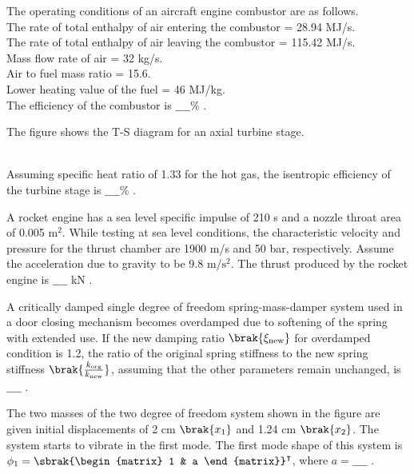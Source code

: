\item The operating conditions of an aircraft engine combustor are as follows. \\
The rate of total enthalpy of air entering the combustor = 28.94 MJ/s. \\
The rate of total enthalpy of air leaving the combustor = 115.42 MJ/s. \\
Mass flow rate of air = 32 kg/s. \\
Air to fuel mass ratio = 15.6. \\
Lower heating value of the fuel = 46 MJ/kg. \\
The efficiency of the combustor is $\_\_\_\_$\% . \\
\item The figure shows the T-S diagram for an axial turbine stage.
\begin{figure}[!ht]
\centering
\resizebox{0.5\textwidth}{!}{%

}%
\end{figure}\\
Assuming specific heat ratio of 1.33 for the hot gas, the isentropic efficiency of the turbine stage is $\_\_\_\_$\% . \\
\item A rocket engine has a sea level specific impulse of 210 s and a nozzle throat area of 0.005 $\text{m}^2$. While testing at sea level conditions, the characteristic velocity and pressure for the thrust chamber are 1900 m/s and 50 bar, respectively. Assume the acceleration due to gravity to be 9.8 m/$\text{s}^2$. The thrust produced by the rocket engine is $\_\_\_\_$ kN . \\
\item A critically damped single degree of freedom spring-mass-damper system used in a door closing mechanism becomes overdamped due to softening of the spring with extended use. If the new damping ratio $\brak{\xi_{\text{new}}}$ for overdamped condition is 1.2, the ratio of the original spring stiffness to the new spring stiffness $\brak{\frac{k_{\text{org}}}{k_{\text{new}}}}$, assuming that the other parameters remain unchanged, is $\_\_\_\_$ . \\
\item The two masses of the two degree of freedom system shown in the figure are given initial displacements of 2 cm $\brak{x_1}$ and 1.24 cm $\brak{x_2}$. The system starts to vibrate in the first mode. The first mode shape of this system is $\phi_1 = \sbrak{\begin{matrix}
    1 & a
\end{matrix}}^\intercal$, where $a = \_\_\_\_$ . 
